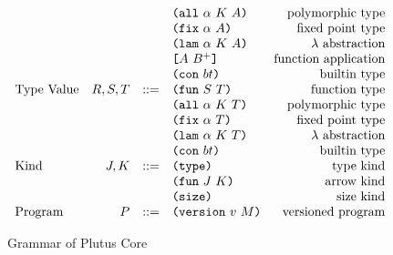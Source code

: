 \documentclass[../main.tex]{subfiles}
\begin{document}
\begin{figure*}[t]
\[\begin{array}{lrclr}
                                  &        &     & \texttt{(} \texttt{all} ~ \alpha ~ K ~ A \texttt{)}        & \textrm{polymorphic type}\\
                                  &        &     & \texttt{(} \texttt{fix} ~ \alpha ~ A \texttt{)}           & \textrm{fixed point type}\\
                                  &        &     & \texttt{(} \texttt{lam} ~ \alpha ~ K ~ A \texttt{)}        & \textrm{$\lambda$ abstraction}\\
                                  &        &     & \texttt{[} A ~ B^+ \texttt{]}              & \textrm{function application}\\
                                  &        &     & \texttt{(} \texttt{con} ~ bt \texttt{)}                  & \textrm{builtin type}\\
        \textrm{Type Value}       & R,S,T  & ::= & \texttt{(} \texttt{fun} ~ S ~ T \texttt{)}                & \textrm{function type}\\
                                  &        &     & \texttt{(} \texttt{all} ~ \alpha ~ K ~ T \texttt{)}        & \textrm{polymorphic type}\\
                                  &        &     & \texttt{(} \texttt{fix} ~ \alpha ~ T \texttt{)}           & \textrm{fixed point type}\\
                                  &        &     & \texttt{(} \texttt{lam} ~ \alpha ~ K ~ T \texttt{)}        & \textrm{$\lambda$ abstraction}\\
                                  &        &     & \texttt{(} \texttt{con} ~ bt \texttt{)}                  & \textrm{builtin type}\\
        \textrm{Kind}             & J,K    & ::= & \texttt{(} \texttt{type} \texttt{)}{}                   & \textrm{type kind}\\
                                  &        &     & \texttt{(} \texttt{fun} ~ J ~ K \texttt{)}                & \textrm{arrow kind}\\
                                  &        &     & \texttt{(} \texttt{size} \texttt{)}{}                   & \textrm{size kind}\\
        \textrm{Program}          & P      & ::= & \texttt{(} \texttt{version} ~ v ~ M \texttt{)}             & \textrm{versioned program}\\

    \end{array}\]
    \caption{Grammar of Plutus Core}
    \label{fig:Plutus_core_grammar}
\end{figure*}
\end{document}
